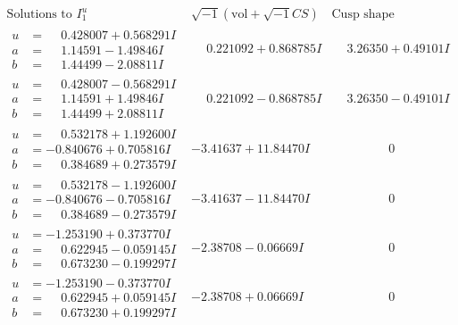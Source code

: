 \documentclass[1p]{elsarticle_modified}
\theoremstyle{definition}
\newcommand{\I}{\sqrt{-1}}
\begin{document}
$$\begin{array}{c|c|c}
\text{Solutions to }I^u_{1}& \I (\text{vol} + \sqrt{-1}CS) & \text{Cusp shape}\\
 \hline 
\begin{aligned}
u &= \phantom{-}0.428007 + 0.568291 I \\
a &= \phantom{-}1.14591 - 1.49846 I \\
b &= \phantom{-}1.44499 - 2.08811 I\end{aligned}
 & \phantom{-}0.221092 + 0.868785 I & \phantom{-}3.26350 + 0.49101 I \\ \hline\begin{aligned}
u &= \phantom{-}0.428007 - 0.568291 I \\
a &= \phantom{-}1.14591 + 1.49846 I \\
b &= \phantom{-}1.44499 + 2.08811 I\end{aligned}
 & \phantom{-}0.221092 - 0.868785 I & \phantom{-}3.26350 - 0.49101 I \\ \hline\begin{aligned}
u &= \phantom{-}0.532178 + 1.192600 I \\
a &= -0.840676 + 0.705816 I \\
b &= \phantom{-}0.384689 + 0.273579 I\end{aligned}
 & -3.41637 + 11.84470 I & \phantom{-0.000000 } 0 \\ \hline\begin{aligned}
u &= \phantom{-}0.532178 - 1.192600 I \\
a &= -0.840676 - 0.705816 I \\
b &= \phantom{-}0.384689 - 0.273579 I\end{aligned}
 & -3.41637 - 11.84470 I & \phantom{-0.000000 } 0 \\ \hline\begin{aligned}
u &= -1.253190 + 0.373770 I \\
a &= \phantom{-}0.622945 - 0.059145 I \\
b &= \phantom{-}0.673230 - 0.199297 I\end{aligned}
 & -2.38708 - 0.06669 I & \phantom{-0.000000 } 0 \\ \hline\begin{aligned}
u &= -1.253190 - 0.373770 I \\
a &= \phantom{-}0.622945 + 0.059145 I \\
b &= \phantom{-}0.673230 + 0.199297 I\end{aligned}
 & -2.38708 + 0.06669 I & \phantom{-0.000000 } 0 \\ \hline\begin{aligned}

\end{aligned}
\end{array}$$
\end{document}
